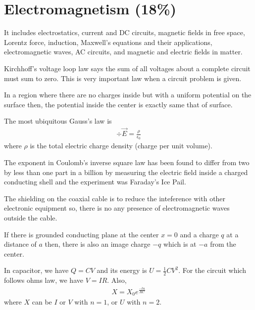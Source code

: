 
\section{Electromagnetism (18\%)}

It includes electrostatics, current and DC circuits, magnetic fields in free space, Lorentz force, induction, Maxwell's equations and their applications, electromagnetic waves, AC circuits, and magnetic and electric fields in matter.


Kirchhoff's voltage loop law says the sum of all voltages about a complete circuit must sum to zero. This is very important law when a circuit problem is given.

In a region where there are no charges inside but with a uniform potential on the surface then, the potential inside the center is exactly same that of surface.

The most ubiquitous Gauss's law is
\begin{align*}
\div\vec{E} = \frac{\rho}{\epsilon_{0}} 
\end{align*}
 where $\rho$ is the total electric charge density (charge per unit volume).
 
The exponent in Coulomb's inverse square law has been found to differ from two by less than one part in a billion by measuring the electric field inside a charged conducting shell and the experiment was Faraday's Ice Pail.

The shielding on the coaxial cable is to reduce the inteference with other electronic equipment so, there is no any presence of electromagnetic waves outside the cable.

If there is grounded conducting plane at the center $x = 0$ and a charge $q$ at a distance of $a$ then, there is also an image charge $-q$ which is at $-a$ from the center.

In capacitor, we have $Q = C V$ and its energy is $U = \frac{1}{2} C V^{2}$. For the circuit which follows ohms law, we have $V = I R$. Also,
\begin{align}
X = X_{0} e^{\frac{-t n}{RC}}
\end{align}
where $X$ can be $I$ or $V$ with $n = 1$, or $U$ with $n = 2$.